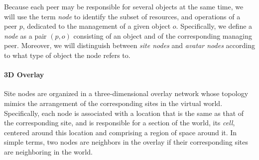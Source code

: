 Because each peer may be responsible for several objects at the same
time, we will use the term \emph{node} to identify the subset of
resources, and operations of a peer $p$, dedicated to the management
of a given object $o$. Specifically, we define a \sol \emph{node} as a
pair $(p, o)$ consisting of an object and of the corresponding
managing peer. Moreover, we will distinguish between \emph{site nodes}
and \emph{avatar nodes} according to what type of object the node
refers to.



\paragraph{3D Overlay}
Site nodes are organized in a three-dimensional overlay network whose
topology mimics the arrangement of the corresponding sites in the
virtual world.
Specifically, each node is associated with a location that is the same
as that of the corresponding site, and is responsible for a section of
the world, its \emph{cell}, centered around this location and
comprising a region of space around it. In simple terms, two nodes are
neighbors in the overlay if their corresponding sites are neighboring
in the \sol world.




